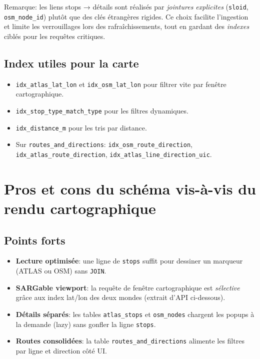 \noindent
Remarque: les liens \og stops → détails \fg{} sont réalisés par \textit{jointures explicites} (\texttt{sloid}, \texttt{osm\_node\_id}) plutôt que des clés étrangères rigides. Ce choix facilite l'ingestion et limite les verrouillages lors des rafraîchissements, tout en gardant des \textit{indexes} ciblés pour les requêtes critiques.

\subsection*{Index utiles pour la carte}
\begin{itemize}
  \item \texttt{idx\_atlas\_lat\_lon} et \texttt{idx\_osm\_lat\_lon} pour filtrer vite par fenêtre cartographique.
  \item \texttt{idx\_stop\_type\_match\_type} pour les filtres dynamiques.
  \item \texttt{idx\_distance\_m} pour les tris par distance.
  \item Sur \texttt{routes\_and\_directions}: \texttt{idx\_osm\_route\_direction}, \texttt{idx\_atlas\_route\_direction}, \texttt{idx\_atlas\_line\_direction\_uic}.
\end{itemize}

\section{Pros et cons du schéma vis-à-vis du rendu cartographique}
\subsection*{Points forts}
\begin{itemize}
  \item \textbf{Lecture optimisée}: une ligne de \texttt{stops} suffit pour dessiner un marqueur (ATLAS ou OSM) sans \texttt{JOIN}.
  \item \textbf{SARGable viewport}: la requête de fenêtre cartographique est \emph{sélective} grâce aux index lat/lon des deux mondes (extrait d'API ci-dessous).
  \item \textbf{Détails séparés}: les tables \texttt{atlas\_stops} et \texttt{osm\_nodes} chargent les popups à la demande (lazy) sans gonfler la ligne \texttt{stops}.
  \item \textbf{Routes consolidées}: la table \texttt{routes\_and\_directions} alimente les filtres par ligne et direction côté UI.
\end{itemize}

